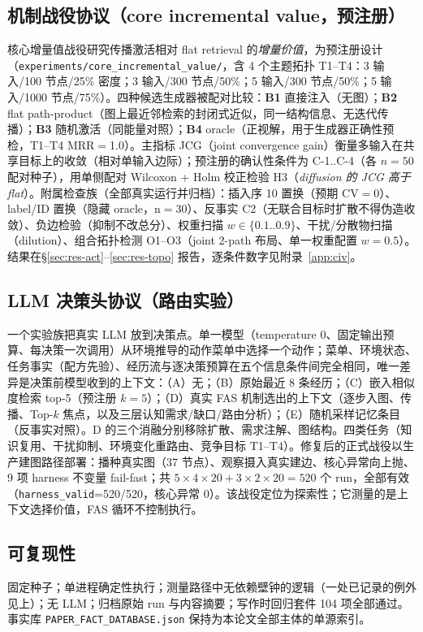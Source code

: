 \documentclass[10pt,a4paper]{ctexart}
\begin{document}
\subsection{机制战役协议（core incremental value，预注册）}
\label{sec:method-civ}
核心增量值战役研究传播激活相对 flat retrieval 的\emph{增量价值}，为预注册设计（\texttt{experiments/core\_incremental\_value/}，含 4 个主题拓扑 T1--T4：3 输入/100 节点/25\% 密度；3 输入/300 节点/50\%；5 输入/300 节点/50\%；5 输入/1000 节点/75\%）。四种候选生成器被配对比较：\textbf{B1} 直接注入（无图）；\textbf{B2} flat path-product（图上最近邻检索的封闭式近似，同一结构信息、无迭代传播）；\textbf{B3} 随机激活（同能量对照）；\textbf{B4} oracle（正视解，用于生成器正确性预检，T1--T4 MRR$=$1.0）。主指标 JCG（joint convergence gain）衡量多输入在共享目标上的收敛（相对单输入边际）；预注册的确认性条件为 C-1..C-4（各 $n{=}50$ 配对种子），用单侧配对 Wilcoxon + Holm 校正检验 H3（\emph{diffusion 的 JCG 高于 flat}）。附属检查族（全部真实运行并归档）：插入序 10 置换（预期 CV$=$0）、label/ID 置换（隐藏 oracle，n$=$30）、反事实 C2（无联合目标时扩散不得伪造收敛）、负边检验（抑制不改总分）、权重扫描 $w\in\{0.1..0.9\}$、干扰/分散物扫描（dilution）、组合拓扑检测 O1--O3（joint 2-path 布局、单一权重配置 $w{=}0.5$）。结果在\S\ref{sec:res-act}--\ref{sec:res-topo} 报告，逐条件数字见附录~\ref{app:civ}。

\subsection{LLM 决策头协议（路由实验）}
\label{sec:method-routing}
一个实验族把真实 LLM 放到决策点。单一模型（temperature $0$、固定输出预算、每决策一次调用）从环境推导的动作菜单中选择一个动作；菜单、环境状态、任务事实（配方先验）、经历流与逐决策预算在五个信息条件间完全相同，唯一差异是决策前模型收到的上下文：（A）无；（B）原始最近 8 条经历；（C）嵌入相似度检索 top-5（预注册 $k{=}5$）；（D）真实 FAS 机制选出的上下文（逐步入图、传播、Top-$k$ 焦点，以及三层认知需求/缺口/路由分析）；（E）随机采样记忆条目（反事实对照）。D 的三个消融分别移除扩散、需求注解、图结构。四类任务（知识复用、干扰抑制、环境变化重路由、竞争目标 T1--T4）。修复后的正式战役以生产建图路径部署：播种真实图（37 节点）、观察摄入真实建边、核心异常向上抛、9 项 harness 不变量 fail-fast；共 $5\times4\times20+3\times2\times20=520$ 个 run，全部有效（\texttt{harness\_valid}=520/520，核心异常 0）。该战役定位为探索性；它测量的是上下文选择价值，FAS 循环不控制执行。

\subsection{可复现性}
固定种子；单进程确定性执行；测量路径中无依赖壁钟的逻辑（一处已记录的例外见上）；无 LLM；归档原始 run 与内容摘要；写作时回归套件 104 项全部通过。事实库 \texttt{PAPER\_FACT\_DATABASE.json} 保持为本论文全部主体的单源索引。
\end{document}
